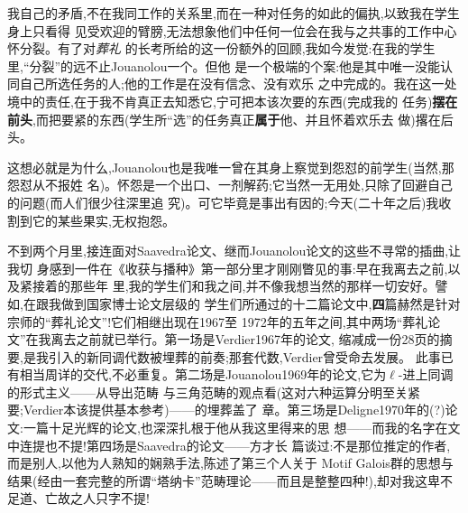 我自己的矛盾,不在我同工作的关系里,而在一种对任务的如此的偏执,以致我在学生身上只看得
见受欢迎的臂膀,无法想象他们中任何一位会在我与之共事的工作中心怀分裂。有了对\emph{葬礼}
的长考所给的这一份额外的回顾,我如今发觉:在我的学生里,“分裂”的远不止Jouanolou一个。但他
是一个极端的个案:他是其中唯一没能认同自己所选任务的人;他的工作是在没有信念、没有欢乐
之中完成的。我在这一处境中的责任,在于我不肯真正去知悉它,宁可把本该次要的东西(完成我的
任务)\textbf{摆在前头},而把要紧的东西(学生所“选”的任务真正\textbf{属于}他、并且怀着欢乐去
做)撂在后头。

这想必就是为什么,Jouanolou也是我唯一曾在其身上察觉到怨怼的前学生(当然,那怨怼从不报姓
名)。怀怨是一个出口、一剂解药;它当然一无用处,只除了回避自己的问题(而人们很少往深里追
究)。可它毕竟是事出有因的;今天(二十年之后)我收割到它的某些果实,无权抱怨。

\pmark{}不到两个月里,接连面对Saavedra论文、继而Jouanolou论文的这些不寻常的插曲,让我切
身感到一件在《收获与播种》第一部分里才刚刚瞥见的事:早在我离去之前,以及紧接着的那些年
里,我的学生们和我之间,并不像我想当然的那样一切安好。譬如,在跟我做到国家博士论文层级的
学生们所通过的十二篇论文中,\textbf{四}篇赫然是针对宗师的“葬礼论文”!它们相继出现在1967至
1972年的五年之间,其中两场“葬礼论文”在我离去之前就已举行。第一场是Verdier1967年的论文,
缩减成一份28页的摘要,是我引入的新同调代数被埋葬的前奏;那套代数,Verdier曾受命去发展。
此事已有相当周详的交代,不必重复。第二场是Jouanolou1969年的论文,它为$\ell$-进上同调的形式主义——从导出范畴
与三角范畴的观点看(这对六种运算分明至关紧要;Verdier本该提供基本参考)——的埋葬盖了
章。第三场是Deligne1970年的(?)论文:一篇十足光辉的论文,也深深扎根于他从我这里得来的思
想——而我的名字在文中连提也不提!第四场是Saavedra的论文——方才长
篇谈过:不是那位推定的作者,而是别人,以他为人熟知的娴熟手法,陈述了第三个人关于 Motif Galois群的思想与\dmark{}结果(经由一套完整的所谓“塔纳卡”范畴理论——而且是整整四种!),却对我这卑不足道、亡故之人只字不提!

